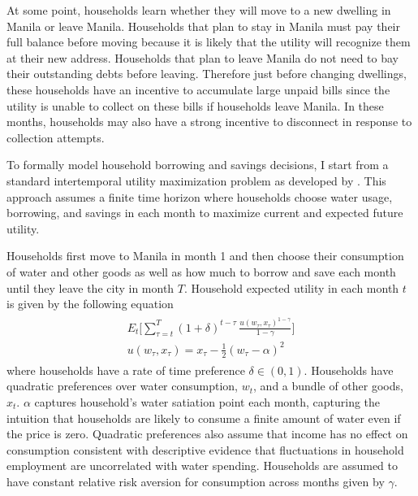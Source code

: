 \documentclass[12pt]{article}
\begin{document}
At some point, households learn whether they will move to a new dwelling in Manila or leave Manila.  Households that plan to stay in Manila must pay their full balance before moving because it is likely that the utility will recognize them at their new address.  Households that plan to leave Manila do not need to bay their outstanding debts before leaving.  Therefore just before changing dwellings, these households have an incentive to accumulate large unpaid bills since the utility is unable to collect on these bills if households leave Manila.  In these months, households may also have a strong incentive to disconnect in response to collection attempts.

To formally model household borrowing and savings decisions, I start from a standard intertemporal utility maximization problem as developed by \cite{deaton1991saving}.  This approach assumes a finite time horizon where households choose water usage, borrowing, and savings in each month to maximize current and expected future utility.  

Households first move to Manila in month 1 and then choose their consumption of water and other goods as well as how much to borrow and save each month until they leave the city in month $T$.  Household expected utility in each month $t$ is given by the following equation
\begin{align}\label{eq:u}
\begin{split}
E_t \Big[ \sum_{\tau = t}^{T} (1+\delta)^{t-\tau} \,\frac{u(w_{\tau},x_{\tau})^{1-\gamma}}{1-\gamma}   \Big]\\
u(w_{\tau},x_{\tau}) =  x_{\tau} -  \frac{1}{2} (w_{\tau} - \alpha)^2
\end{split} 
\end{align}
where households have a rate of time preference $\delta \in (0,1)$.  Households have quadratic preferences over water consumption, $w_{t}$, and a bundle of other goods, $x_{t}$.  $\alpha$ captures household's water satiation point each month, capturing the intuition that households are likely to consume a finite amount of water even if the price is zero.  Quadratic preferences also assume that income has no effect on consumption consistent with descriptive evidence that fluctuations in household employment are uncorrelated with water spending.  Households are assumed to have constant relative risk aversion for consumption across months given by $\gamma$.

\end{document}
